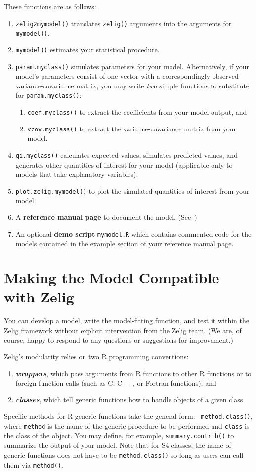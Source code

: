 These functions are as follows:  
\begin{enumerate}
\item {\tt zelig2mymodel()} translates {\tt zelig()} arguments into
the arguments for {\tt mymodel()}.
\item {\tt mymodel()} estimates your statistical procedure.
\item {\tt param.myclass()} simulates parameters for your model.
Alternatively, if your model's parameters consist of one vector with a
correspondingly observed variance-covariance matrix, you may write
\emph{two} simple functions to substitute for {\tt param.myclass()}:  
\begin{enumerate}
\item {\tt coef.myclass()} to extract the coefficients from your model
output, and
\item {\tt vcov.myclass()} to extract the variance-covariance matrix
from your model.  
\end{enumerate}
\item {\tt qi.myclass()} calculates expected values, simulates
predicted values, and generates other quantities of interest for your
model (applicable only to models that take explanatory variables).  
\item {\tt plot.zelig.mymodel()} to plot the simulated quantities of
interest from your model.  
\item A {\bf reference manual page} to document the model.
  (See~)
\item An optional {\bf demo script} {\tt mymodel.R} which contains commented code for
  the models contained in the example section of your reference manual
  page.
\end{enumerate}

\section{Making the Model Compatible with Zelig}\label{compatible}

You can develop a model, write the model-fitting function, and test it
within the Zelig framework without explicit intervention from the
Zelig team.  (We are, of course, happy to respond to any questions or
suggestions for improvement.)  

Zelig's modularity relies on two R programming conventions:
\begin{enumerate}
\item \emph{\bf wrappers}, which pass arguments from R functions to
  other R functions or to foreign function calls (such as C, C++, or
  Fortran functions); and 
\item \emph{\bf classes}, which tell generic functions how to handle
  objects of a given class.  
\end{enumerate}
Specific methods for R generic functions take the general form: {\tt
  method.class()}, where {\tt method} is the name of the generic
procedure to be performed and {\tt class} is the class of the object.
You may define, for example, {\tt summary.contrib()} to summarize the
output of your model. Note that for S4 classes, the name of generic
functions does not have to be {\tt method.class()} so long as users
can call them via {\tt method()}.

